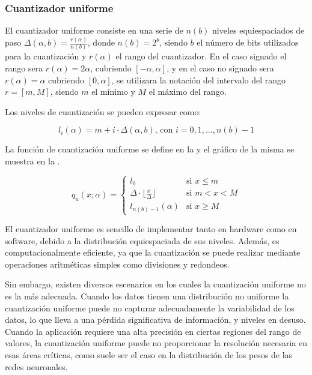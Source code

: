 \subsubsection{Cuantizador uniforme}
\label{sec:uniform}

El cuantizador uniforme consiste en una serie de $n\left(b\right)$ niveles equiespaciados de paso $\Delta\left(\alpha, b\right) = \frac{r\left(\alpha\right)}{n\left(b\right)}$, donde $n\left(b\right) = 2^b$, siendo $b$ el número de bits utilizados para la cuantización y $r\left(\alpha\right)$ el rango del cuantizador. En el caso signado el rango sera $r(\alpha) = 2 \alpha$, cubriendo $[-\alpha, \alpha]$, y en el caso no signado sera $r(\alpha) = \alpha$ cubriendo $[0, \alpha]$, se utilizara la notación del intervalo del rango $r = [m, M]$, siendo $m$ el mínimo y $M$ el máximo del rango.

Los niveles de cuantización se pueden expresar como:

\begin{equation}
    \label{eq:uniform_quantizer_level_value}
    l_i\left(\alpha\right) = m + i \cdot \Delta\left(\alpha, b\right) \text{, con } i = 0, 1, \ldots, n\left(b\right) - 1
\end{equation}

La función de cuantización uniforme se define en la  y el gráfico de la misma se muestra en la .

\begin{equation}
    \label{eq:uniform_quantizer}
    q_u(x; \alpha) =
    \begin{cases}
        l_{0} & \text{si $x \leq m$} \\
        \Delta \cdot \lfloor \frac{x}{\Delta} \rfloor & \text{si } m < x < M \\
        l_{n\left(b\right) - 1}\left(\alpha\right) & \text{si } x \geq M
    \end{cases}
\end{equation}


El cuantizador uniforme es sencillo de implementar tanto en hardware como en software, debido a la distribución equiespaciada de sus niveles. Además, es computacionalmente eficiente, ya que la cuantización se puede realizar mediante operaciones aritméticas simples como divisiones y redondeos.

Sin embargo, existen diversos escenarios en los cuales la cuantización uniforme no es la más adecuada. Cuando los datos tienen una distribución no uniforme la cuantización uniforme puede no capturar adecuadamente la variabilidad de los datos, lo que lleva a una pérdida significativa de información, y niveles en desuso. Cuando la aplicación requiere una alta precisión en ciertas regiones del rango de valores, la cuantización uniforme puede no proporcionar la resolución necesaria en esas áreas críticas, como suele ser el caso en la distribución de los pesos de las redes neuronales.

